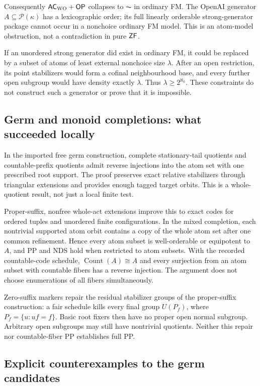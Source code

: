 Consequently $\mathsf{AC}_{\mathrm{WO}}+\mathsf{OP}$ collapses to $\AC$ in ordinary FM. The OpenAI generator $A\subseteq\mathcal P(\kappa)$ has a lexicographic order; its full linearly orderable strong-generator package cannot occur in a nonchoice ordinary FM model. This is an atom-model obstruction, not a contradiction in pure $\mathsf{ZF}$.

If an unordered strong generator did exist in ordinary FM, it could be replaced by a subset of atoms of least external nonchoice size $\lambda$. After an open restriction, its point stabilizers would form a cofinal neighbourhood base, and every further open subgroup would have density exactly $\lambda$. Thus $\lambda\geq2^{\aleph_0}$. These constraints do not construct such a generator or prove that it is impossible.

\subsection{Germ and monoid completions: what succeeded locally}
In the imported free germ construction, complete stationary-tail quotients and countable-prefix quotients admit reverse injections into the atom set with one prescribed root support. The proof preserves exact relative stabilizers through triangular extensions and provides enough tagged target orbits. This is a whole-quotient result, not just a local finite test.

Proper-suffix, nonfree whole-act extensions improve this to exact codes for ordered tuples and unordered finite configurations. In the mixed completion, each nontrivial supported atom orbit contains a copy of the whole atom set after one common refinement. Hence every atom subset is well-orderable or equipotent to $A$, and PP and NDS hold when restricted to atom subsets. With the recorded countable-code schedule, $\operatorname{Count}(A)\cong A$ and every surjection from an atom subset with countable fibers has a reverse injection. The argument does not choose enumerations of all fibers simultaneously.

Zero-suffix markers repair the residual stabilizer groups of the proper-suffix construction: a fair schedule kills every final group $U(P_f)$, where $P_f=\{u:uf=f\}$. Basic root fixers then have no proper open normal subgroup. Arbitrary open subgroups may still have nontrivial quotients. Neither this repair nor countable-fiber PP establishes full PP.

\subsection{Explicit counterexamples to the germ candidates}
